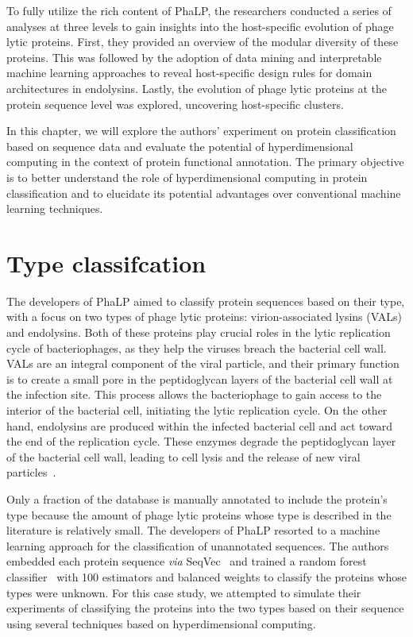 To fully utilize the rich content of PhaLP, the researchers conducted a series of analyses at three levels to gain insights into the host-specific evolution of phage lytic proteins. First, they provided an overview of the modular diversity of these proteins. This was followed by the adoption of data mining and interpretable machine learning approaches to reveal host-specific design rules for domain architectures in endolysins. Lastly, the evolution of phage lytic proteins at the protein sequence level was explored, uncovering host-specific clusters.

In this chapter, we will explore the authors' experiment on protein classification based on sequence data and evaluate the potential of hyperdimensional computing in the context of protein functional annotation. The primary objective is to better understand the role of hyperdimensional computing in protein classification and to elucidate its potential advantages over conventional machine learning techniques.

\section{Type classifcation}
The developers of PhaLP aimed to classify protein sequences based on their type, with a focus on two types of phage lytic proteins: virion-associated lysins (VALs) and endolysins. Both of these proteins play crucial roles in the lytic replication cycle of bacteriophages, as they help the viruses breach the bacterial cell wall. VALs are an integral component of the viral particle, and their primary function is to create a small pore in the peptidoglycan layers of the bacterial cell wall at the infection site. This process allows the bacteriophage to gain access to the interior of the bacterial cell, initiating the lytic replication cycle. On the other hand, endolysins are produced within the infected bacterial cell and act toward the end of the replication cycle. These enzymes degrade the peptidoglycan layer of the bacterial cell wall, leading to cell lysis and the release of new viral particles~\cite{phalp}.

Only a fraction of the database is manually annotated to include the protein's type because the amount of phage lytic proteins whose type is described in the literature is relatively small. The developers of PhaLP resorted to a machine learning approach for the classification of unannotated sequences. The authors embedded each protein sequence \textit{via} SeqVec~\cite{seqvec} and trained a random forest classifier~\cite{randomforest} with 100 estimators and balanced weights to classify the proteins whose types were unknown. For this case study, we attempted to simulate their experiments of classifying the proteins into the two types based on their sequence using several techniques based on hyperdimensional computing.

